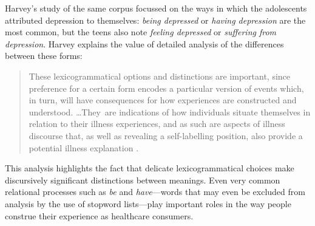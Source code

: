 Harvey's \cite*{harvey_disclosures_2012} study of the same \gls{corpus} focussed on the ways in which the adolescents attributed depression to themselves: \emph{being depressed} or \emph{having depression} are the most common, but the teens also note \emph{feeling depressed} or \emph{suffering from depression}. Harvey explains the value of detailed analysis of the differences between these forms:

\begin{quote}\small\singlespacing
These lexicogrammatical options and distinctions are important, since preference for a certain form encodes a particular version of events which, in turn, will have consequences for how experiences are constructed and understood. \lbrack \dots They\rbrack~are indications of how individuals situate themselves in relation to their illness experiences, and as such are aspects of illness discourse that, as well as revealing a self-labelling position, also provide a potential illness explanation \parencite*[p.~361]{harvey_disclosures_2012}.
\end{quote}
%
This analysis highlights the fact that delicate lexicogrammatical choices make discursively significant distinctions between meanings. Even very common relational processes such as \emph{be} and \emph{have}---words that may even be excluded from analysis by the use of stopword lists---play important roles in the way people construe their experience as healthcare \glspl{consumer}.





